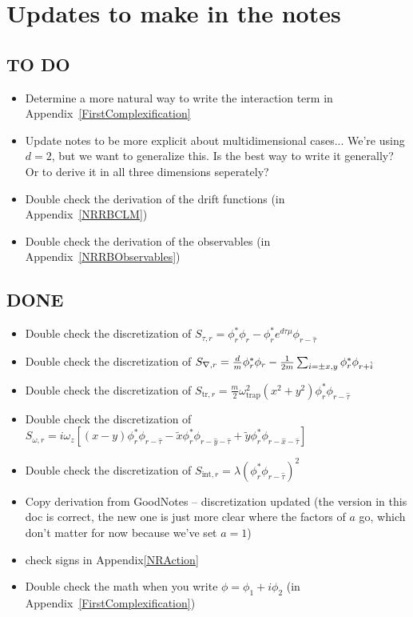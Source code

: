 \documentclass[../RotatingBosons.tex]{subfiles}
\begin{document}
\section{Updates to make in the notes}
\subsection{TO DO}
\begin{itemize}
	\item Determine a more natural way to write the interaction term in Appendix~\ref{FirstComplexification}
	\item Update notes to be more explicit about multidimensional cases... We're using $d=2$, but we want to generalize this. Is the best way to write it generally? Or to derive it in all three dimensions seperately?
	\item Double check the derivation of the drift functions (in Appendix~\ref{NRRBCLM})
	\item Double check the derivation of the observables (in Appendix~\ref{NRRBObservables})
\end{itemize}

\subsection{DONE}
\begin{itemize}
	\item Double check the discretization of $S_{\tau, r}  =  \phi^{*}_{r}\phi_{r}- \phi^{*}_{r}e^{d \tau \mu} \phi_{r - \hat{\tau}} $
	\item Double check the discretization of $S_{{\nabla}, r}  =  \frac{d}{m} \phi^{*}_{r}\phi_{r} - \frac{1}{2m}\sum_{i = \pm x,y} \phi^{*}_{r}\phi_{r+\hat{i}}$
	\item Double check the discretization of $S_{\mathrm{tr},r} = \frac{m}{2}\omega_{\text{trap}}^{2}(x^{2}+y^{2})\phi_{r}^{*}\phi_{r-\hat{\tau}}$
	\item Double check the discretization of $S_{\omega, r} =  i \omega_{z} \left[ (x-y)\phi_{r}^{*}  \phi_{r-\hat{\tau}} - \widetilde{x} \phi_{r}^{*} \phi_{r-\hat{y}-\hat{\tau}} + \widetilde{y} \phi_{r}^{*}  \phi_{r-\hat{x}-\hat{\tau}} \right] $
	\item Double check the discretization of $S_{\text{int}, r} = \lambda \left(\phi_{r}^{*} \phi_{r-\hat{\tau}}\right)^{2}$	
	\item Copy derivation from GoodNotes -- discretization updated (the version in this doc is correct, the new one is just more clear where the factors of $a$ go, which don't matter for now because we've set $a = 1$)
	\item check signs in Appendix\ref{NRAction}
	\item Double check the math when you write $\phi = \phi_{1} + i\phi_{2}$ (in Appendix~\ref{FirstComplexification})
\end{itemize}
\end{document}

